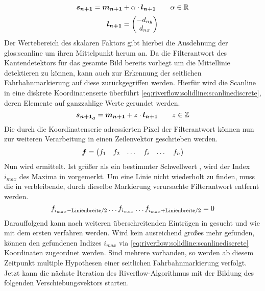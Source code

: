 \begin{equation}
\label{eq:riverflow:solidline:scanlinecontinous}
\boldsymbol{s_{n+1}} =
\boldsymbol{m_{n+1}}  + \alpha \cdot \boldsymbol{l_{n+1}}
\qquad \alpha \in \mathbb{R}
\end{equation}
\begin{equation}
\label{eq:riverflow:solidline:scanlinedirectionvec}
\boldsymbol{l_{n+1}} =
\begin{pmatrix}
-d_{ny} \\
d_{nx}
\end{pmatrix}
\end{equation}
Der Wertebereich des skalaren Faktors \scl{\alpha} gibt hierbei die Ausdehnung der \gls{glos:scanline} um ihren Mittelpunkt  herum an.
Da die Filterantwort des Kantendetektors für das gesamte Bild bereits vorliegt um die Mittellinie detektieren zu können, kann auch zur Erkennung der seitlichen Fahrbahnmarkierung auf diese zurückgegriffen werden. Hierfür wird die Scanline in eine diskrete Koordinatenserie überführt \ref{eq:riverflow:solidline:scanlinediscrete}, deren Elemente auf ganzzahlige Werte gerundet werden.
\begin{equation}
\label{eq:riverflow:solidline:scanlinediscrete}
\boldsymbol{s_{{n+1}_d}} =
\boldsymbol{m_{n+1}}  + z \cdot \boldsymbol{l_{n+1}} 
\qquad z \in \mathbb{Z}
\end{equation}
Die durch die Koordinatenserie adressierten Pixel der Filterantwort können nun zur weiteren Verarbeitung in einen Zeilenvektor geschrieben werden. 
 \begin{equation}
 \boldsymbol{f} =
 \begin{pmatrix}
 f_1 & f_2 & \dots & f_i & \dots & f_n
 \end{pmatrix}
 \end{equation}
Nun wird  ermittelt. Ist  größer als ein bestimmter Schwellwert , wird der Index \begin{math} i_{max} \end{math} des Maxima in  vorgemerkt. Um eine Linie nicht wiederholt zu finden, muss die in  verbleibende, durch dieselbe Markierung verursachte Filterantwort entfernt  werden.
\begin{equation}
f_{i_{max}-\text{Linienbreite}/2} \dots f_{i_{max}} 
 \dots  f_{i_{max}+\text{Linienbreite}/2} = 0
 \end{equation}
Darauffolgend kann nach weiteren  überschreitenden Einträgen in  gesucht und wie mit dem ersten  verfahren werden.
Wird kein ausreichend großes  mehr gefunden, können den gefundenen Indizes \begin{math} i_{max} \end{math} via \eqref{eq:riverflow:solidline:scanlinediscrete} Koordinaten  zugeordnet werden.
Sind mehrere  vorhanden, so werden ab diesem Zeitpunkt multiple Hypothesen einer seitlichen Fahrbahnmarkierung verfolgt.
Jetzt kann die nächste Iteration des Riverflow-Algorithmus mit der Bildung des folgenden Verschiebungsvektors  starten.

